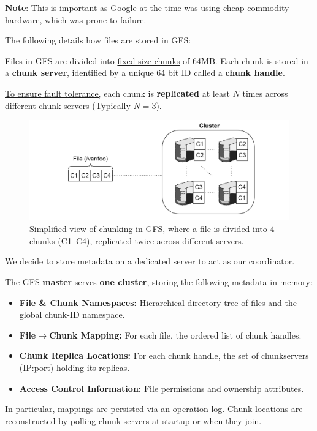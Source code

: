 \vspace{1em}
\noindent
\textbf{Note}: This is important as Google at the time was using cheap commodity hardware, which was prone to failure.

\newpage 

\noindent
The following details how files are stored in GFS:

\begin{Def}

  Files in GFS are divided into \underline{fixed-size chunks} of 64MB.
  Each chunk is stored in a \textbf{chunk server}, identified by a unique 64 bit ID called a \textbf{chunk handle}.

  \underline{To ensure fault tolerance,} each chunk is \textbf{replicated} at least $N$ times across different chunk servers (Typically $N=3$).
\end{Def}

\begin{figure}[h]
  \centering
  \includegraphics[width=\textwidth]{Sections/gfs/chunk.png}
  \caption{Simplified view of chunking in GFS, where a file is divided into 4 chunks (C1--C4), replicated twice across different servers.}
  \label{fig:gfs-chunking}
\end{figure}


\noindent
We decide to store metadata on a dedicated server to act as our coordinator.
\begin{Def}

  The GFS \textbf{master} serves \textbf{one cluster}, storing the following metadata in memory:
  \begin{itemize}
    \item \textbf{File \& Chunk Namespaces:} Hierarchical directory tree of files and the global chunk-ID namespace.
    \item \textbf{File$\to$Chunk Mapping:} For each file, the ordered list of chunk handles.
    \item \textbf{Chunk Replica Locations:} For each chunk handle, the set of chunkservers (IP:port) holding its replicas.
    \item \textbf{Access Control Information:} File permissions and ownership attributes.
  \end{itemize}
  
  \noindent
  In particular, mappings are persisted via an operation log. 
  Chunk locations are reconstructed by polling chunk servers at startup or when they join.
\end{Def}




